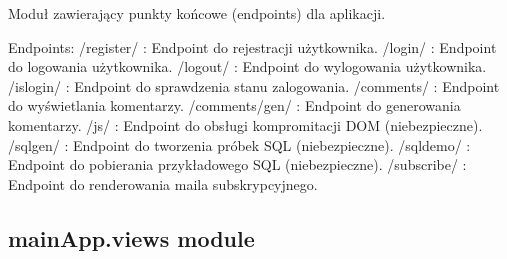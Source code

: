 \documentclass[letterpaper,11pt,polish]{sphinxmanual}
\begin{document}
\begin{fulllineitems}
\label{\detokenize{mainApp:mainApp.urls.urlpatterns}}
\pysigstartsignatures
{}
\pysigstopsignatures
\sphinxAtStartPar
Moduł zawierający punkty końcowe (endpoints) dla aplikacji.

\sphinxAtStartPar
Endpoints:
\sphinxhyphen{} /register/ : Endpoint do rejestracji użytkownika.
\sphinxhyphen{} /login/ : Endpoint do logowania użytkownika.
\sphinxhyphen{} /logout/ : Endpoint do wylogowania użytkownika.
\sphinxhyphen{} /islogin/ : Endpoint do sprawdzenia stanu zalogowania.
\sphinxhyphen{} /comments/ : Endpoint do wyświetlania komentarzy.
\sphinxhyphen{} /comments/gen/ : Endpoint do generowania komentarzy.
\sphinxhyphen{} /js/ : Endpoint do obsługi kompromitacji DOM (niebezpieczne).
\sphinxhyphen{} /sqlgen/ : Endpoint do tworzenia próbek SQL (niebezpieczne).
\sphinxhyphen{} /sqldemo/ : Endpoint do pobierania przykładowego SQL (niebezpieczne).
\sphinxhyphen{} /subscribe/ : Endpoint do renderowania maila subskrypcyjnego.

\end{fulllineitems}



\subsection{mainApp.views module}
\label{\detokenize{mainApp:module-mainApp.views}}\label{\detokenize{mainApp:mainapp-views-module}}
\end{document}
